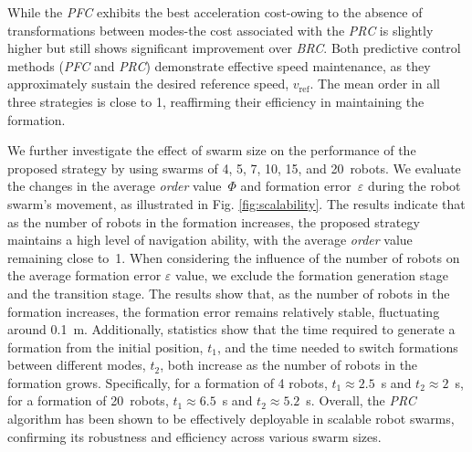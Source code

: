 While the \textit{PFC} exhibits the best acceleration cost-owing to the absence of transformations between modes-the cost associated with the \textit{PRC} is slightly higher but still shows significant improvement over \textit{BRC}. Both predictive control methods (\textit{PFC} and \textit{PRC}) demonstrate effective speed maintenance, as they approximately sustain the desired reference speed, $v_\text{ref}$. The mean order in all three strategies is close to 1, reaffirming their efficiency in maintaining the formation.

We further investigate the effect of swarm size on the performance of the proposed strategy by using swarms of 4, 5, 7, 10, 15, and 20~robots. We evaluate the changes in the average \textit{order} value~$\Phi$ and formation error~$\varepsilon$ during the robot swarm's movement, as illustrated in Fig. \ref{fig:scalability}. The results indicate that as the number of robots in the formation increases, the proposed strategy maintains a high level of navigation ability, with the average \textit{order} value remaining close to~1. When considering the influence of the number of robots on the average formation error $\varepsilon$ value, we exclude the formation generation stage and the transition stage. The results show that, as the number of robots in the formation increases, the formation error remains relatively stable, fluctuating around 0.1~m. Additionally, statistics show that the time required to generate a formation from the initial position, $t_1$, and the time needed to switch formations between different modes, $t_2$, both increase as the number of robots in the formation grows. Specifically, for a formation of 4 robots, $t_1 \approx 2.5$~s and $t_2 \approx 2$~s, for a formation of 20~robots, $t_1\approx6.5$~s and $t_2\approx5.2$~s. Overall, the \textit{PRC} algorithm has been shown to be effectively deployable in scalable robot swarms, confirming its robustness and efficiency across various swarm sizes.

